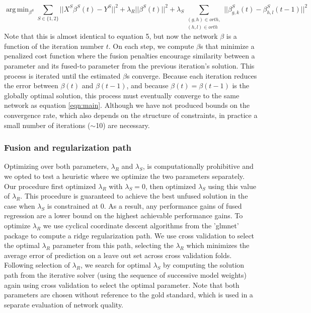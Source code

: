 \documentclass[11pt]{article}
\DeclareMathOperator*{\argmin}{arg\,min}
\begin{document}
\begin{equation}
\argmin_{\beta^S} \displaystyle\sum_{S \in \{1, 2\}} ||X^{S}\beta^{S}(t) - Y^{S}||^2 + \lambda_R||\beta^{S}(t)||^2 + \lambda_S\displaystyle \sum_{\substack{(g,h) \in orth,\\
 (h,l) \in orth}} ||\beta^{S}_{g,k}(t) - \beta_{h,l}^{S}(t-1)||^2
\end{equation}
Note that this is almost identical to equation 5, but now the network $\beta$ is a function of the iteration number $t$. On each step, we compute $\beta$s that minimize a penalized cost function where the fusion penalties encourage similarity between a parameter and its fused-to parameter from the previous iteration's solution. 
This process is iterated until the estimated $\beta$s converge. 
Because each iteration reduces the error between $\beta(t)$ and $\beta(t-1)$, and because $\beta(t) = \beta(t-1)$ is the globally optimal solution, this process must eventually converge to the same network as equation \ref{eqn:main}. 
Although we have not produced bounds on the convergence rate, which also depends on the structure of constraints, in practice a small number of iterations ($\sim$10) are necessary.


\subsubsection{Fusion and regularization path}
Optimizing over both parameters, $\lambda_R$ and $\lambda_S$, is computationally prohibitive and we opted to test a heuristic where we optimize the two parameters separately. 
Our procedure first optimized $\lambda_R$ with $\lambda_S=0$, then optimized $\lambda_S$ using this value of $\lambda_R$. 
This procedure is guaranteed to achieve the best unfused solution in the case when $\lambda_S$ is constrained at 0. 
As a result, any performance gains of fused regression are a lower bound on the highest achievable performance gains. 
To optimize $\lambda_R$ we use cyclical coordinate descent algorithms from the 'glmnet' package \cite{friedman_regularization_2010} to compute a ridge regularization path. 
We use cross validation to select the optimal $\lambda_R$ parameter from this path, selecting the $\lambda_R$ which minimizes the average error of prediction on a leave out set across cross validation folds. 
Following selection of $\lambda_R$, we search for optimal $\lambda_S$ by computing the solution path from the iterative solver (using the sequence of successive model weights) again using cross validation to select the optimal parameter. 
Note that both parameters are chosen without reference to the gold standard, which is used in a separate evaluation of network quality. 
\end{document}
